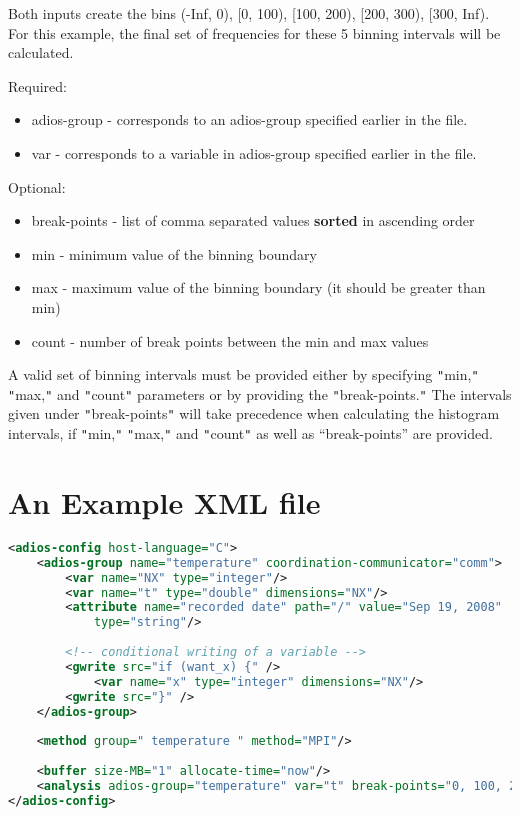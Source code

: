 Both inputs create the bins (-Inf, 0), [0, 100), [100, 200), [200, 300), [300, 
Inf). For this example, the final set of frequencies for these 5 binning intervals 
will be calculated.

Required:
\begin{itemize}
\item adios-group - corresponds to an adios-group specified earlier in the file.
\item var - corresponds to a variable in adios-group specified earlier in the file.
\end{itemize}

Optional:
\begin{itemize}
\item break-points - list of comma separated values \textbf{sorted} in ascending order
\item min  - minimum value of the binning boundary
\item max - maximum value of the binning boundary 
(it should be greater than min)
\item count - number of break points between the min and max values 
\end{itemize}

A valid set of binning intervals must be provided either by specifying \texttt{"}min,\texttt{"} 
\texttt{"}max,\texttt{"} and \texttt{"}count\texttt{"} parameters or by providing 
the \texttt{"}break-points.\texttt{"} The intervals given under \texttt{"}break-points\texttt{"} 
will take precedence when calculating the histogram intervals, if \texttt{"}min,\texttt{"} 
\texttt{"}max,\texttt{"} and \texttt{"}count\texttt{"} as well as ``break-points'' 
are provided.

\section{An Example XML file}

\begin{lstlisting}[language=XML, caption=Example XML file.]
<adios-config host-language="C">
	<adios-group name="temperature" coordination-communicator="comm">
		<var name="NX" type="integer"/>
		<var name="t" type="double" dimensions="NX"/>
		<attribute name="recorded date" path="/" value="Sep 19, 2008" 
			type="string"/> 
		
		<!-- conditional writing of a variable -->
		<gwrite src="if (want_x) {" />
			<var name="x" type="integer" dimensions="NX"/>
		<gwrite src="}" />
	</adios-group>
	
	<method group=" temperature " method="MPI"/>
	
	<buffer size-MB="1" allocate-time="now"/>
	<analysis adios-group="temperature" var="t" break-points="0, 100, 200, 300"/> 
</adios-config>
\end{lstlisting}

